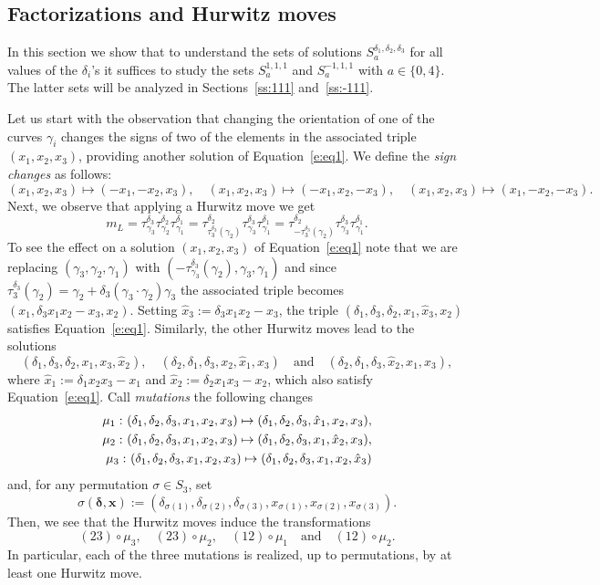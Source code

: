 \documentclass[11pt,a4paper]{amsart}
\newcommand{\de}{\delta}
\newcommand{\si}{\sigma}
\newcommand{\ga}{\gamma}
\newcommand{\co}{\thinspace\colon}
\newcommand{\bde}{\bm{\de}}
\newcommand{\bx}{\bm{x}}
\theoremstyle{definition}
\numberwithin{equation}{section}
\begin{document}
\subsection{Factorizations and Hurwitz moves}\label{ss:hurwitz} 

In this section we show that to understand the sets of solutions $S_a^{\de_1,\de_2,\de_3}$ for all values of the $\de_i$'s it suffices to study the sets $S_a^{1,1,1}$ and $S_a^{-1,1,1}$ with $a \in \{0,4\}$. 
The latter sets will be analyzed in Sections~\ref{ss:111} and~\ref{ss:-111}. 

Let us start with the observation that changing the orientation of one of the curves $\ga_i$ changes the signs of two of the elements in the associated triple $(x_1,x_2,x_3)$, providing another solution of Equation~\eqref{e:eq1}. 
We define the {\em sign changes} as follows:
\[
(x_1,x_2,x_3)\mapsto (-x_1,-x_2,x_3),\quad (x_1,x_2,x_3)\mapsto (-x_1,x_2,-x_3),
\quad (x_1,x_2,x_3)\mapsto (x_1,-x_2,-x_3).
\label{e:sign-changes}
\]
Next, we observe that applying a Hurwitz move we get 
\[
m_L = 
\tau_{\ga_3}^{\de_3}\tau_{\ga_2}^{\de_2}\tau_{\ga_1}^{\de_1} = 
\tau_{\tau_3^{\de_3}(\ga_2)}^{\de_2}\tau_{\ga_3}^{\de_3}\tau_{\ga_1}^{\de_1} = 
\tau_{-\tau_3^{\de_3}(\ga_2)}^{\de_2}\tau_{\ga_3}^{\de_3}\tau_{\ga_1}^{\de_1}.
\]
To see the effect on a solution $(x_1,x_2,x_3)$ of Equation~\eqref{e:eq1} note that 
we are replacing $(\ga_3,\ga_2,\ga_1)$ with $(-\tau_{\ga_3}^{\de_3}(\ga_2),\ga_3,\ga_1)$
and since $\tau_3^{\de_3}(\ga_2) = \ga_2+\de_3(\ga_3\cdot\ga_2)\ga_3$
the associated triple becomes $(x_1,\de_3 x_1 x_2-x_3, x_2)$.
Setting $\hat x_3 := \de_3 x_1 x_2 - x_3$, the triple  
$(\de_1,\de_3,\de_2,x_1,\hat x_3,x_2)$ satisfies Equation~\eqref{e:eq1}. Similarly, the other Hurwitz 
moves lead to the solutions 
\[
(\de_1,\de_3,\de_2,x_1, x_3, \hat x_2),\quad 
(\de_2,\de_1,\de_3,x_2,\hat x_1,x_3)\quad\text{and}\quad 
(\de_2,\de_1,\de_3,\hat x_2,x_1,x_3), 
\]
where 
$\hat x_1 := \de_1 x_2 x_3 - x_1$ and $\hat x_2 := \de_2 x_1 x_3 - x_2$, which also 
satisfy Equation~\eqref{e:eq1}. Call {\em mutations} the following changes 
\[
\begin{split}
\mu_1\co (\de_1,\de_2,\de_3,x_1,x_2,x_3)\mapsto ( \de_1,\de_2,\de_3,\hat x_1, x_2, x_3),\\ 
\mu_2\co (\de_1,\de_2,\de_3,x_1,x_2,x_3)\mapsto (\de_1,\de_2,\de_3,x_1, \hat x_2, x_3),\\ 
\mu_3\co (\de_1,\de_2,\de_3,x_1,x_2,x_3)\mapsto (\de_1,\de_2,\de_3,x_1, x_2, \hat x_3)
\end{split}
\]
and, for any permutation $\si\in S_3$, set 
\[
\si(\bde,\bx) := (\de_{\si(1)},\de_{\si(2)},\de_{\si(3)},x_{\si(1)},x_{\si(2)},x_{\si(3)}).
\]
Then, we see that the Hurwitz moves induce the transformations
\[
(23)\circ\mu_3,\quad 
(23)\circ\mu_2,\quad 
(12)\circ\mu_1\quad\text{and}\quad
(12)\circ\mu_2. 
\]
In particular, each of the three mutations is realized, up to permutations, by at least one Hurwitz move.
\end{document}
